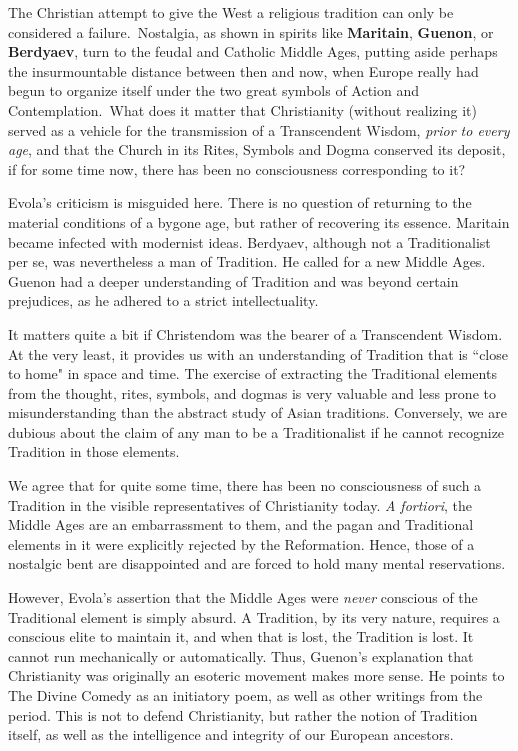 The Christian attempt to give the West a religious tradition can only be considered a failure. Nostalgia, as shown in spirits like \textbf{Maritain}, \textbf{Guenon}, or \textbf{Berdyaev}, turn to the feudal and Catholic Middle Ages, putting aside perhaps the insurmountable distance between then and now, when Europe really had begun to organize itself under the two great symbols of Action and Contemplation. What does it matter that Christianity (without realizing it) served as a vehicle for the transmission of a Transcendent Wisdom, \emph{prior to every age}, and that the Church in its Rites, Symbols and Dogma conserved its deposit, if for some time now, there has been no consciousness corresponding to it? 

\begin{quotationx}
Evola's criticism is misguided here. There is no question of returning to the material conditions of a bygone age, but rather of recovering its essence. Maritain became infected with modernist ideas. Berdyaev, although not a Traditionalist per se, was nevertheless a man of Tradition. He called for a new Middle Ages. Guenon had a deeper understanding of Tradition and was beyond certain prejudices, as he adhered to a strict intellectuality.

It matters quite a bit if Christendom was the bearer of a Transcendent Wisdom. At the very least, it provides us with an understanding of Tradition that is ``close to home" in space and time. The exercise of extracting the Traditional elements from the thought, rites, symbols, and dogmas is very valuable and less prone to misunderstanding than the abstract study of Asian traditions. Conversely, we are dubious about the claim of any man to be a Traditionalist if he cannot recognize Tradition in those elements.

We agree that for quite some time, there has been no consciousness of such a Tradition in the visible representatives of Christianity today. \emph{A fortiori}, the Middle Ages are an embarrassment to them, and the pagan and Traditional elements in it were explicitly rejected by the Reformation. Hence, those of a nostalgic bent are disappointed and are forced to hold many mental reservations.

However, Evola's assertion that the Middle Ages were \emph{never} conscious of the Traditional element is simply absurd. A Tradition, by its very nature, requires a conscious elite to maintain it, and when that is lost, the Tradition is lost. It cannot run mechanically or automatically. Thus, Guenon's explanation that Christianity was originally an esoteric movement makes more sense. He points to The Divine Comedy as an initiatory poem, as well as other writings from the period. This is not to defend Christianity, but rather the notion of Tradition itself, as well as the intelligence and integrity of our European ancestors. 

\end{quotationx}
